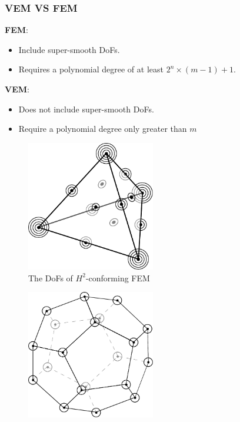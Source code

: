 \documentclass[notheorems,serif]{beamer}
\begin{document}
\begin{CJK}{UTF8}{gkai}
\begin{frame}
    \frametitle{VEM VS FEM}
\begin{minipage}[b]{0.49\linewidth}
    \large{\textbf{FEM}}:
    \begin{itemize}
        \item Include super-smooth DoFs.
        \item Requires a polynomial degree of at least $2^n \times (m-1)
            +1$.
    \end{itemize}
    \vspace{22pt}
\end{minipage}
\hfill
\begin{minipage}[b]{0.49\linewidth}
    \large{\textbf{VEM}}:
    \begin{itemize}
        \item Does not include super-smooth DoFs.
        \item Require a polynomial degree only greater than $m$
    \end{itemize}
    \vspace{10pt}
\end{minipage}
\begin{minipage}[b]{0.49\linewidth}
    \begin{figure}[htpb]
        \centering
        \includegraphics[width=0.5\textwidth]{../figures/hmvem/smooth3d.pdf}
        \caption{The DoFs of $H^2$-conforming FEM}
    \end{figure}
\end{minipage}
\hfill
\begin{minipage}[b]{0.49\linewidth}
    \begin{figure}[htpb]
        \centering
        \includegraphics[width=0.5\textwidth]{../figures/hmvem/hmdof3d.pdf}

\end{figure}
\end{minipage}
\end{frame}
\end{CJK}
\end{document}

